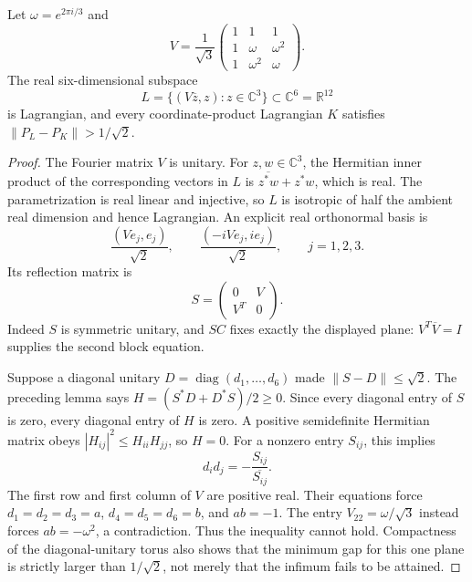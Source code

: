 \begin{theorem}\ours
Let \(\omega=e^{2\pi i/3}\) and
\[
 V=\frac1{\sqrt3}
 \begin{pmatrix}1&1&1\\1&\omega&\omega^2\\1&\omega^2&\omega\end{pmatrix}.
\]
The real six-dimensional subspace
\[
 L=\{(V\overline z,z):z\in\mathbb C^3\}\subset\mathbb C^6
       =\mathbb R^{12}
\]
is Lagrangian, and every coordinate-product Lagrangian \(K\) satisfies
\(\|P_L-P_K\|>1/\sqrt2\).
\end{theorem}
\begin{proof}
The Fourier matrix \(V\) is unitary. For \(z,w\in\mathbb C^3\), the
Hermitian inner product of the corresponding vectors in \(L\) is
\(\overline{z^*w}+z^*w\), which is real. The parametrization is real
linear and injective, so \(L\) is isotropic of half the ambient real
dimension and hence Lagrangian. An explicit real orthonormal basis is
\[
 \frac{(Ve_j,e_j)}{\sqrt2},\qquad
 \frac{(-iVe_j,ie_j)}{\sqrt2},\qquad j=1,2,3.
\]
Its reflection matrix is
\[
 S=\begin{pmatrix}0&V\\V^T&0\end{pmatrix}.
\]
Indeed \(S\) is symmetric unitary, and \(SC\) fixes exactly the displayed
plane: \(V^T\overline V=I\) supplies the second block equation.

Suppose a diagonal unitary \(D=\operatorname{diag}(d_1,\ldots,d_6)\)
made \(\|S-D\|\le\sqrt2\). The preceding lemma says
\(H=(S^*D+D^*S)/2\ge0\). Since every diagonal entry of \(S\) is zero,
every diagonal entry of \(H\) is zero. A positive semidefinite Hermitian
matrix obeys \(|H_{ij}|^2\le H_{ii}H_{jj}\), so \(H=0\).
For a nonzero entry \(S_{ij}\), this implies
\[
 d_i d_j=-\frac{S_{ij}}{\overline{S_{ij}}}. \tag{G3}
\]
The first row and first column of \(V\) are positive real. Their
equations force \(d_1=d_2=d_3=a\), \(d_4=d_5=d_6=b\), and \(ab=-1\).
The entry \(V_{22}=\omega/\sqrt3\) instead forces
\(ab=-\omega^2\), a contradiction. Thus the inequality cannot hold.
Compactness of the diagonal-unitary torus also shows that the minimum
gap for this one plane is strictly larger than \(1/\sqrt2\), not merely
that the infimum fails to be attained.
\end{proof}

